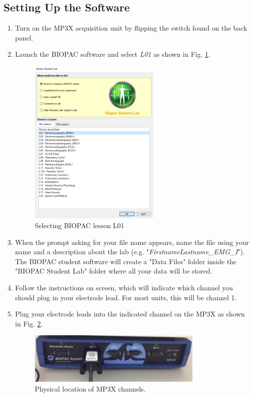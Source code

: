 \documentclass{article}
\begin{document}
\subsection*{Setting Up the Software}
\begin{enumerate}
	\item Turn on the MP3X acquisition unit by flipping the switch found on the back panel.
	\item Launch the BIOPAC software and select \textit{L01} as shown in Fig. \ref{lesson}.
		\begin{figure}[h]
	\includegraphics[width=0.6\textwidth]{../images/EMG_I_13.png}
		\centering
		\caption{Selecting BIOPAC lesson L01}
		\label{lesson}
		\end{figure}
		
	\item When the prompt asking for your file name appears, name the file using your name and a description about the lab (e.g. "\textit{FirstnameLastname\_EMG\_I}"). The BIOPAC student software will create a "Data Files" folder inside the "BIOPAC Student Lab" folder where all your data will be stored.
	\item Follow the instructions on screen, which will indicate which channel you should plug in your electrode lead. For most units, this will be channel 1.	
	\item Plug your electrode leads into the indicated channel on the MP3X as shown in Fig. \ref{channel2}.
		\begin{figure}[h]
	\includegraphics[width=0.8\textwidth]{../images/EMG_I_6.jpg}
		\centering
		\caption{Physical location of MP3X channels.}
		\label{channel2}
		\end{figure}
	

\end{enumerate}
\end{document}
